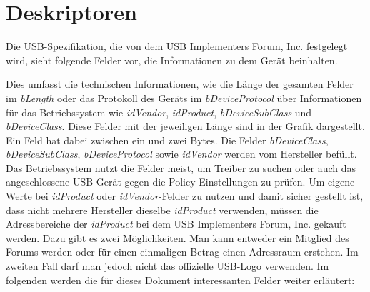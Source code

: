 \newpage
\section{Deskriptoren}\label{Deskriptoren}
Die USB-Spezifikation, die von dem USB Implementers Forum, Inc.\cite{USBAbout} festgelegt wird, sieht folgende Felder vor, die Informationen zu dem Gerät beinhalten.


Dies umfasst die technischen Informationen, wie die Länge der gesamten Felder im \textit{bLength} oder das Protokoll des Geräts im \textit{bDeviceProtocol} über Informationen für das Betriebssystem wie \textit{idVendor}, \textit{idProduct}, \textit{bDeviceSubClass} und \textit{bDeviceClass}. Diese Felder mit der jeweiligen Länge sind in der Grafik dargestellt. Ein Feld hat dabei zwischen ein und zwei Bytes. Die Felder \textit{bDeviceClass}, \textit{bDeviceSubClass}, \textit{bDeviceProtocol} sowie \textit{idVendor} werden vom Hersteller befüllt.\cite{USBDesk} Das Betriebssystem nutzt die Felder meist, um Treiber zu suchen oder auch das angeschlossene USB-Gerät gegen die Policy-Einstellungen zu prüfen. Um eigene Werte bei \textit{idProduct} oder \textit{idVendor}-Felder zu nutzen und damit sicher gestellt ist, dass nicht mehrere Hersteller dieselbe \textit{idProduct} verwenden, müssen die Adressbereiche der \textit{idProduct} bei dem USB Implementers Forum, Inc. gekauft werden. Dazu gibt es zwei Möglichkeiten. Man kann entweder ein Mitglied des Forums werden oder für einen einmaligen Betrag einen Adressraum erstehen. Im zweiten Fall darf man jedoch nicht das offizielle USB-Logo verwenden. \cite{USBVendor} Im folgenden werden die für dieses Dokument interessanten Felder weiter erläutert:


